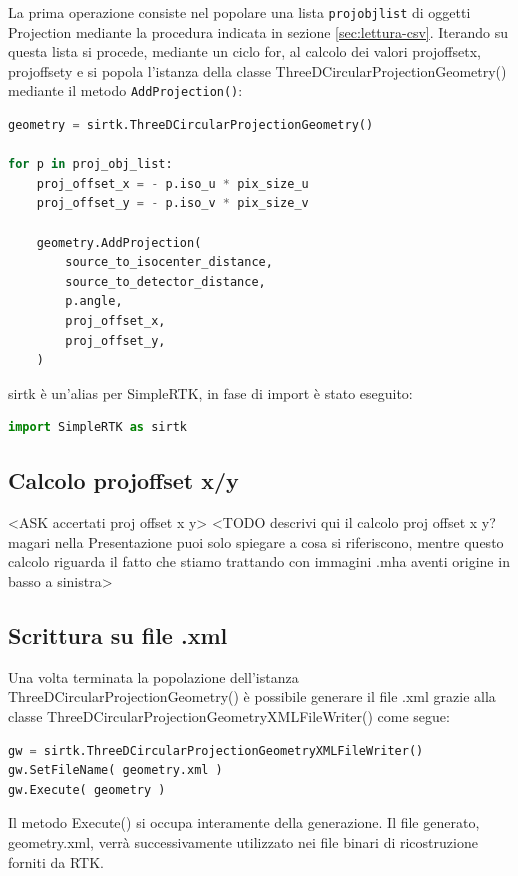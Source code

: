\documentclass[a4paper,12pt, doubleside]{report}
\begin{document}
                    La prima operazione consiste nel popolare una lista \texttt{proj\textunderscore obj\textunderscore list} di oggetti Projection mediante la procedura indicata in sezione \ref{sec:lettura-csv}.
                    Iterando su questa lista si procede, mediante un ciclo for, al calcolo dei valori proj\textunderscore offset\textunderscore x, proj\textunderscore offset\textunderscore y e si popola l'istanza della classe ThreeDCircularProjectionGeometry() mediante il metodo \texttt{AddProjection()}:
                
                    \begin{lstlisting}[language=python, frame=bt]
geometry = sirtk.ThreeDCircularProjectionGeometry()

for p in proj_obj_list:
    proj_offset_x = - p.iso_u * pix_size_u
    proj_offset_y = - p.iso_v * pix_size_v

    geometry.AddProjection(
        source_to_isocenter_distance,
        source_to_detector_distance,
        p.angle,
        proj_offset_x,
        proj_offset_y,
    )
                    \end{lstlisting}
                sirtk è un'alias per SimpleRTK, in fase di import è stato eseguito:
                \begin{lstlisting}[language=python, frame=bt]
import SimpleRTK as sirtk
                \end{lstlisting}
                
        
            \subsection{Calcolo proj\textunderscore offset \textunderscore x/y}
                <ASK accertati proj offset x y>
                <TODO descrivi qui il calcolo proj offset x y? magari nella Presentazione puoi solo spiegare a cosa si riferiscono, mentre questo calcolo riguarda il fatto che stiamo trattando con immagini .mha aventi origine in basso a sinistra>
                
            \subsection{Scrittura su file .xml}
                \par 
                    Una volta terminata la popolazione dell'istanza ThreeDCircularProjectionGeometry() è possibile generare il file .xml grazie alla classe ThreeDCircularProjectionGeometryXMLFileWriter() come segue:
                    \begin{lstlisting}[language=python, frame=bt]
gw = sirtk.ThreeDCircularProjectionGeometryXMLFileWriter()
gw.SetFileName( geometry.xml )
gw.Execute( geometry )
                    \end{lstlisting}
                    Il metodo Execute() si occupa interamente della generazione. Il file generato, geometry.xml, verrà successivamente utilizzato nei file binari di ricostruzione forniti da RTK.
        
\end{document}
